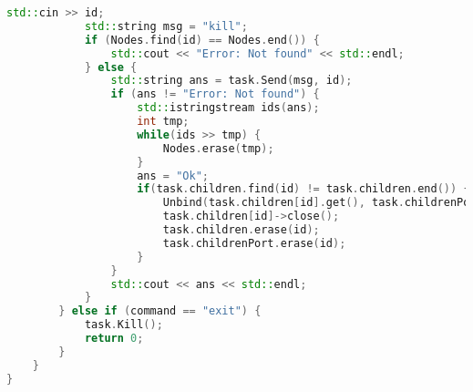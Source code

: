 \documentclass[a4paper, 12pt]{article}
\begin{document}
\begin{lstlisting}[language=C++]
            std::cin >> id;
            std::string msg = "kill";
            if (Nodes.find(id) == Nodes.end()) {
                std::cout << "Error: Not found" << std::endl;
            } else {
                std::string ans = task.Send(msg, id);
                if (ans != "Error: Not found") {
                    std::istringstream ids(ans);
                    int tmp;
                    while(ids >> tmp) {
                        Nodes.erase(tmp);
                    }
                    ans = "Ok";
                    if(task.children.find(id) != task.children.end()) {
                        Unbind(task.children[id].get(), task.childrenPort[id]);
                        task.children[id]->close();
                        task.children.erase(id);
                        task.childrenPort.erase(id);
                    }
                }
                std::cout << ans << std::endl;
            }
        } else if (command == "exit") {
            task.Kill();
            return 0;
        }
    }
}
\end{lstlisting}
\end{document}
